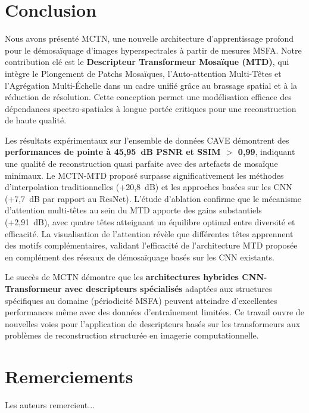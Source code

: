 \documentclass[conference]{IEEEtran}
\begin{document}
\section{Conclusion}

Nous avons présenté MCTN, une nouvelle architecture d'apprentissage profond pour le démosaïquage d'images hyperspectrales à partir de mesures MSFA. Notre contribution clé est le \textbf{Descripteur Transformeur Mosaïque (MTD)}, qui intègre le Plongement de Patchs Mosaïques, l'Auto-attention Multi-Têtes et l'Agrégation Multi-Échelle dans un cadre unifié grâce au brassage spatial et à la réduction de résolution. Cette conception permet une modélisation efficace des dépendances spectro-spatiales à longue portée critiques pour une reconstruction de haute qualité.

Les résultats expérimentaux sur l'ensemble de données CAVE démontrent des \textbf{performances de pointe à 45,95~dB PSNR et SSIM $>$ 0,99}, indiquant une qualité de reconstruction quasi parfaite avec des artefacts de mosaïque minimaux. Le MCTN-MTD proposé surpasse significativement les méthodes d'interpolation traditionnelles (+20,8~dB) et les approches basées sur les CNN (+7,7~dB par rapport au ResNet). L'étude d'ablation confirme que le mécanisme d'attention multi-têtes au sein du MTD apporte des gains substantiels (+2,91~dB), avec quatre têtes atteignant un équilibre optimal entre diversité et efficacité. La visualisation de l'attention révèle que différentes têtes apprennent des motifs complémentaires, validant l'efficacité de l'architecture MTD proposée en complément des réseaux de démosaïquage basés sur les CNN existants.

Le succès de MCTN démontre que les \textbf{architectures hybrides CNN-Transformeur avec descripteurs spécialisés} adaptées aux structures spécifiques au domaine (périodicité MSFA) peuvent atteindre d'excellentes performances même avec des données d'entraînement limitées. Ce travail ouvre de nouvelles voies pour l'application de descripteurs basés sur les transformeurs aux problèmes de reconstruction structurée en imagerie computationnelle.

\section*{Remerciements}

Les auteurs remercient...
\end{document}
